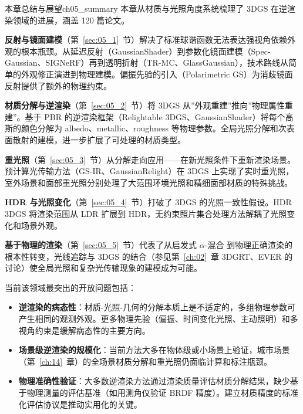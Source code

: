 \begin{futurebox}{本章总结与展望}{ch05_summary}
本章从材质与光照角度系统梳理了 3DGS 在逆渲染领域的进展，涵盖 120 篇论文。

\textbf{反射与镜面建模}（第~\ref{sec:05_1}~节）解决了标准球谐函数无法表达强视角依赖外观的根本瓶颈。从延迟反射（GaussianShader）到参数化镜面建模（Spec-Gaussian、SIGNeRF）再到透明折射（TR-MC、GlassGaussian），技术路线从简单的外观修正演进到物理建模。偏振先验的引入（Polarimetric GS）为消歧镜面反射提供了额外的物理约束。

\textbf{材质分解与逆渲染}（第~\ref{sec:05_2}~节）将 3DGS 从”外观重建”推向”物理属性重建”。基于 PBR 的逆渲染框架（Relightable 3DGS、GaussianShader）将每个高斯的颜色分解为 albedo、metallic、roughness 等物理参数。全局光照分解和次表面散射的建模，进一步扩展了可处理的材质类型。

\textbf{重光照}（第~\ref{sec:05_3}~节）从分解走向应用——在新光照条件下重新渲染场景。预计算光传输方法（GS-IR、GaussianRelight）在 3DGS 上实现了实时重光照，室外场景和面部重光照分别处理了大范围环境光照和精细面部材质的特殊挑战。

\textbf{HDR 与光照变化}（第~\ref{sec:05_4}~节）打破了 3DGS 的光照一致性假设。HDR 3DGS 将渲染范围从 LDR 扩展到 HDR，无约束照片集合处理方法解耦了光照变化和场景外观。

\textbf{基于物理的渲染}（第~\ref{sec:05_5}~节）代表了从启发式 $\alpha$-混合 到物理正确渲染的根本性转变，光线追踪与 3DGS 的结合（参见第~\ref{ch:02}~章 3DGRT、EVER 的讨论）使全局光照和复杂光传输现象的建模成为可能。

当前该领域最突出的开放问题包括：
\begin{itemize}
\item \textbf{逆渲染的病态性}：材质-光照-几何的分解本质上是不适定的，多组物理参数可产生相同的观测外观。更多物理先验（偏振、时间变化光照、主动照明）和多视角约束是缓解病态性的主要方向。
\item \textbf{场景级逆渲染的规模化}：当前方法大多在物体级或小场景上验证，城市场景（第~\ref{ch:14}~章）的全场景材质分解和重光照仍面临计算和标注瓶颈。
\item \textbf{物理准确性验证}：大多数逆渲染方法通过渲染质量评估材质分解结果，缺少基于物理测量的评估基准（如用测角仪验证 BRDF 精度）。建立材质精度的标准化评估协议是推动实用化的关键。
\end{itemize}
\end{futurebox}
